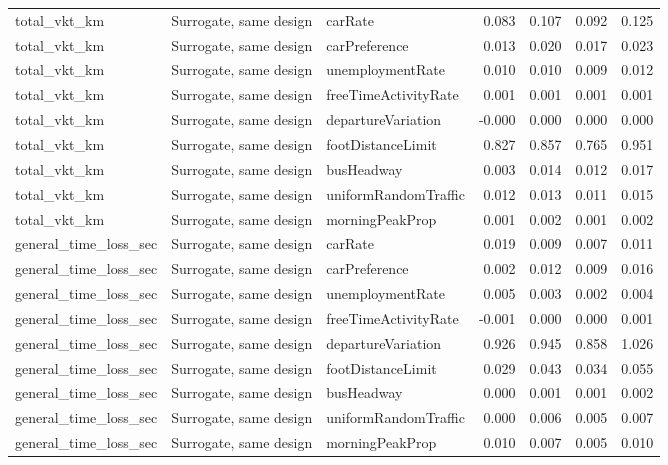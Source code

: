 \begin{table}[!htbp]
\begin{tabular}{lllrrrr}
total\_vkt\_km & Surrogate, same design & carRate & 0.083 & 0.107 & 0.092 & 0.125 \\
total\_vkt\_km & Surrogate, same design & carPreference & 0.013 & 0.020 & 0.017 & 0.023 \\
total\_vkt\_km & Surrogate, same design & unemploymentRate & 0.010 & 0.010 & 0.009 & 0.012 \\
total\_vkt\_km & Surrogate, same design & freeTimeActivityRate & 0.001 & 0.001 & 0.001 & 0.001 \\
total\_vkt\_km & Surrogate, same design & departureVariation & -0.000 & 0.000 & 0.000 & 0.000 \\
total\_vkt\_km & Surrogate, same design & footDistanceLimit & 0.827 & 0.857 & 0.765 & 0.951 \\
total\_vkt\_km & Surrogate, same design & busHeadway & 0.003 & 0.014 & 0.012 & 0.017 \\
total\_vkt\_km & Surrogate, same design & uniformRandomTraffic & 0.012 & 0.013 & 0.011 & 0.015 \\
total\_vkt\_km & Surrogate, same design & morningPeakProp & 0.001 & 0.002 & 0.001 & 0.002 \\
general\_time\_loss\_sec & Surrogate, same design & carRate & 0.019 & 0.009 & 0.007 & 0.011 \\
general\_time\_loss\_sec & Surrogate, same design & carPreference & 0.002 & 0.012 & 0.009 & 0.016 \\
general\_time\_loss\_sec & Surrogate, same design & unemploymentRate & 0.005 & 0.003 & 0.002 & 0.004 \\
general\_time\_loss\_sec & Surrogate, same design & freeTimeActivityRate & -0.001 & 0.000 & 0.000 & 0.001 \\
general\_time\_loss\_sec & Surrogate, same design & departureVariation & 0.926 & 0.945 & 0.858 & 1.026 \\
general\_time\_loss\_sec & Surrogate, same design & footDistanceLimit & 0.029 & 0.043 & 0.034 & 0.055 \\
general\_time\_loss\_sec & Surrogate, same design & busHeadway & 0.000 & 0.001 & 0.001 & 0.002 \\
general\_time\_loss\_sec & Surrogate, same design & uniformRandomTraffic & 0.000 & 0.006 & 0.005 & 0.007 \\
general\_time\_loss\_sec & Surrogate, same design & morningPeakProp & 0.010 & 0.007 & 0.005 & 0.010 \\
\bottomrule
\end{tabular}
\end{table}
